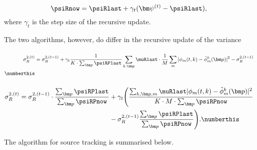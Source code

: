 \begin{equation}
\label{eq:crem-psi}
    \psiRnow = \psiRlast +\gamma_t(\bm\psi^{(t)} -\psiRlast ),
\end{equation}
\renewcommand{\*}{\cdot}
where $\gamma_t$ is the step size of the recursive update.

The two algorithms, however, do differ in the recursive update of the variance

\paragraph{}
\begin{align*}
    \sigma_R^{2,(t)} &= \sigma_R^{2,(t-1)}+\gamma_t\frac{1}{K\*\sum_{\bm p}\psiRPlast} \sum_{k,\bm p}\muRlast\*\frac{1}{M}\sum_{m}|\phi_m(t,k)-\tilde\phi_m^k(\bm p)|^2-\sigma_{R}^{2,(t-1)}\\
\numberthis\label{eq:trem-var}
\end{align*}

\paragraph{}
\begin{align*}
    \sigma_R^{2,(t)} = \sigma_R^{2,(t-1)}\cdot\frac{\sum_{\bm p}\psiRPlast}{\sum_{\bm p}\psiRPnow}&+\gamma_t\Bigg ( \frac{\sum_{k,\bm p,m}\muRlast|\phi_m(t,k)-\tilde\phi_m^k(\bm p)|^2}{K \* M \* \sum_{\bm p}\psiRPnow}\\
    &-\sigma_R^{2,(t-1)}\frac{\sum_{\bm p}\psiRPlast}{\sum_{\bm p}\psiRPnow} \Bigg ).
\numberthis\label{eq:crem-var}
\end{align*}

The algorithm for source tracking is summarised below.



